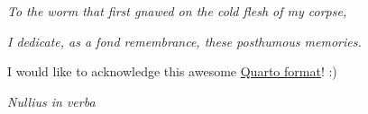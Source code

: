 \documentclass[
12pt,
openright,
oneside,
a4paper,
chapter=TITLE,
section=TITLE,
french,
spanish,
brazil,
english
]{abntex2}
\begin{document}
\begin{dedicatoria}
  \vspace*{\fill}
  \centering
\textit{To the worm that first gnawed on the cold flesh of my corpse,}

\textit{I dedicate, as a fond remembrance, these posthumous memories.}\footnotemark{}

	\vspace*{\fill}
\end{dedicatoria}


\begin{agradecimentos}
I would like to acknowledge this awesome
\href{https://github.com/danielvartan/abnt}{Quarto format}! :)
\end{agradecimentos}


\begin{epigrafe}
  \vspace*{\fill}
	\begin{flushright}
\textit{Nullius in verba}\footnotemark{}

	\end{flushright}
\end{epigrafe}

\end{document}
